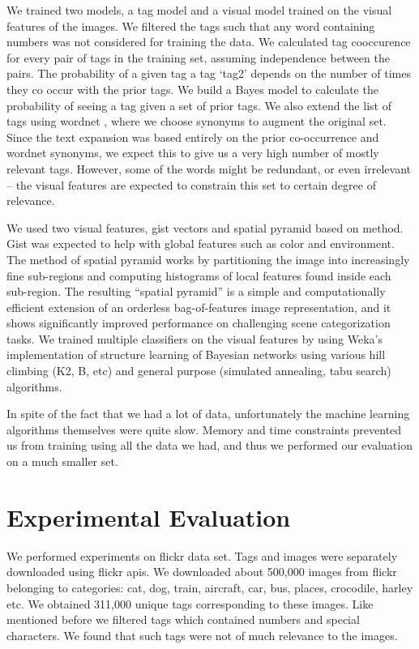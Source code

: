 \documentclass[12pt]{article}
\begin{document}
We trained two models, a tag model and a visual model trained on the visual
features of the images. We filtered the tags such that any word containing
numbers was not considered for training the data. We calculated tag
cooccurence for every pair of tags in the training set, assuming independence
between the pairs. The probability of a given tag  a tag `tag2' depends
on the number of times they co occur with the prior tags. We build a Bayes
model to calculate the probability of seeing a tag given a set of prior tags.
We also extend the list of tags using wordnet , where we
choose synonyms to augment the original set. Since the text expansion was based
entirely on the prior co-occurrence and wordnet synonyms, we expect this
to give us a very high number of mostly relevant tags. However, some of the words
might be redundant, or even irrelevant -- the visual features are expected
to constrain this set to certain degree of relevance.

We used two visual features, gist vectors and spatial pyramid based on
 method. Gist was expected to help with global features such as
color and environment. The method of spatial pyramid works by partitioning the
image into increasingly ﬁne sub-regions and computing histograms of
local features found inside each sub-region. The resulting ``spatial pyramid''
is a simple and computationally efficient extension of an orderless
bag-of-features image representation, and it
shows significantly improved performance on challenging scene categorization
tasks. We trained multiple classifiers on the visual features by using Weka's
 implementation of structure learning of Bayesian networks using
various hill climbing (K2, B, etc) and general purpose (simulated annealing, tabu search)
algorithms.

In spite of the fact that we had a lot of data, unfortunately the machine learning
algorithms themselves were quite slow. Memory and time constraints prevented us from
training using all the data we had, and thus we performed our evaluation on a much
smaller set.


\section{Experimental Evaluation}
We performed experiments on flickr data set. Tags and images were separately downloaded using
flickr apis. We downloaded about 500,000 images from flickr belonging to categories: cat,
dog, train, aircraft, car, bus, places, crocodile, harley etc. We obtained 311,000 unique tags
corresponding to these images. Like mentioned before we filtered tags which contained numbers
and special characters. We found that such tags were not of much relevance to the images.
\end{document}
